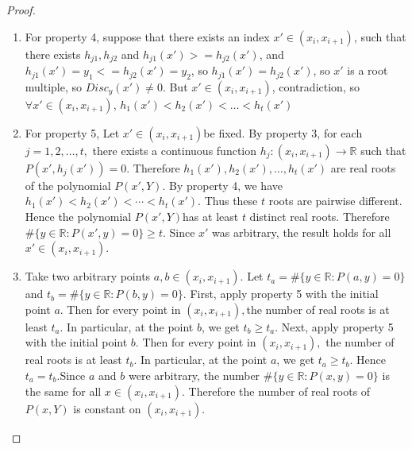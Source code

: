 \documentclass{article}
\begin{document}
\begin{proof}
\begin{enumerate}
               Since both functions extend \(g_j\), the set \(A\) is nonempty. Also, since \(h_j\) and \(\widetilde h_j\) are continuous, \(A\) is closed. Now let \(u_0\in A\), and set \(v_0=h_j(u_0)=\widetilde h_j(u_0). \) Since \(u_0\in (x_i,x_{i+1}),\) we have \(\operatorname{Disc}_y(P)(u_0)\neq 0.\)Thus \(\frac{\partial P}{\partial y}(u_0,v_0)\neq 0. \) By the local uniqueness in the implicit function theorem, \(h_j\) and \(\widetilde h_j\) are equal in a small neighborhood of \(u_0\). Hence \(A\) is open.So \(A\) is nonempty, open and closed in the interval \((x_i,x_{i+1}).\) Since this interval is connected, we get \(A=(x_i,x_{i+1}).\) Therefore \(h_j=\widetilde h_j.\)This proves uniqueness.
        \item  For property 4, suppose that there exists an index \(x' \in (x_{i}, x_{i+1})\), such that there exists \(h_{j1}, h_{j2}\) and \(h_{j1}(x') >= h_{j2}(x')\), and \(h_{j1}(x')=y_{1}<=h_{j2}(x')=y_{2}\), so \(h_{j1}(x')=h_{j2}(x')\), so \(x'\) is a root multiple, so \(Disc_{y}(x') \neq 0\). But \(x' \in (x_{i},x_{i+1})\), contradiction, so \(\forall x'\in (x_{i},x_{i+1})\), \(h_{1}(x') < h_{2}(x') < \dots < h_{t}(x')\)
        \item  For property 5, Let \(x'\in (x_i,x_{i+1})\)be fixed. By property 3, for each \(j=1,2,\dots,t,\) there exists a continuous function \(h_j:(x_i,x_{i+1})\to \mathbb{R}\) such that \(P(x',h_j(x'))=0.\) Therefore \(h_1(x'),h_2(x'),\dots,h_t(x')\) are real roots of the polynomial \(P(x',Y).\) By property 4, we have \(h_1(x')<h_2(x')<\cdots<h_t(x').\) Thus these \(t\) roots are pairwise different. Hence the polynomial \(P(x',Y)\)has at least \(t\) distinct real roots. Therefore \(\#\{y\in\mathbb{R}:P(x',y)=0\}\geq t.\) Since \(x'\) was arbitrary, the result holds for all \(x'\in (x_i,x_{i+1}).\)
        \item  Take two arbitrary points \(a,b\in (x_i,x_{i+1}).\) Let \(t_a=\#\{y\in\mathbb{R}:P(a,y)=0\}\) and \(t_b=\#\{y\in\mathbb{R}:P(b,y)=0\}.\) First, apply property 5 with the initial point \(a\). Then for every point in \((x_i,x_{i+1}),\)the number of real roots is at least \(t_a\). In particular, at the point \(b\), we get \(t_b\geq t_a.\) Next, apply property 5 with the initial point \(b\). Then for every point in \((x_i,x_{i+1}),\) the number of real roots is at least \(t_b\). In particular, at the point \(a\), we get \(t_a\geq t_b.\) Hence \(t_a=t_b.\)Since \(a\) and \(b\) were arbitrary, the number \(\#\{y\in\mathbb{R}:P(x,y)=0\}\) is the same for all \(x\in (x_i,x_{i+1}).\) Therefore the number of real roots of \(P(x,Y)\) is constant on \((x_i,x_{i+1}).\)
    \end{enumerate}
\end{proof}
\end{document}
